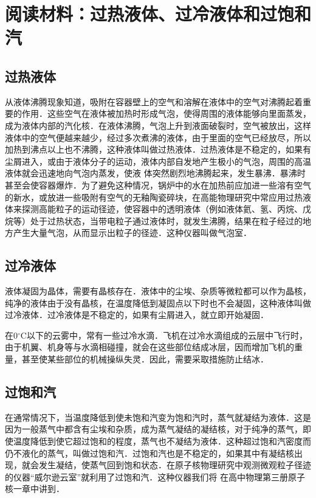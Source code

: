 \section*{阅读材料：过热液体、过冷液体和过饱和汽}
\subsection*{过热液体} 

从液体沸腾现象知道，吸附在容器壁上的空气和溶解在液体中的空气对沸腾起着重要的作用．这些空气在液体被加热时形成气泡，使得周围的液体能够向里面蒸发，成为液体内部的汽化核．在液体沸腾，气泡上升到液面破裂时，空气被放出，这样液体中的空气便越来越少，经过多次煮沸的液体，由于里面的空气已经放尽，所以加热到沸点以上也不沸腾，这种液体叫做过热液体．过热液体是不稳定的，如果有尘屑进入，或由于液体分子的运动，液体内部自发地产生极小的气泡，周围的高温液体就会迅速地向气泡内蒸发，使液
体突然剧烈地沸腾起来，发生暴沸．暴沸时甚至会使容器爆炸．为了避免这种情况，锅炉中的水在加热前应加进一些溶有空气的新水，或放进一些吸附有空气的无釉陶瓷碎块，在高能物理研究中常应用过热液体来探测高能粒子的运动径迹，使容器中的透明液体（例如液体氦、氢、丙烷、戊烷等）处于过热状态，当带电粒子通过液体时，就发生沸腾，结果在粒子经过的地方产生大量气泡，从而显示出粒子的径迹．这种仪器叫做气泡室．

\subsection*{过冷液体} 
液体凝固为晶体，需要有晶核存在．液体中的尘埃、杂质等微粒都可以作为晶核，纯净的液体由于没有晶核，在温度降低到凝固点以下时也不会凝固，这种液体叫做过冷液体．过冷液体是不稳定的，如果有尘屑进入，就立即开始凝固．

在0$^\circ$C以下的云雾中，常有一些过冷水滴．飞机在过冷水滴组成的云层中飞行时，由于机翼、机身等与水滴相碰撞，就会在这些部位结成冰层，因而增加飞机的重量，甚至使某些部位的机械操纵失灵．因此，需要采取措施防止结冰．

\subsection*{过饱和汽} 
在通常情况下，当温度降低到使未饱和汽变为饱和汽时，蒸气就凝结为液体．这是因为一般蒸气中都含有尘埃和杂质，成为蒸气凝结的凝结核，对于纯净的蒸气，即使温度降低到使它超过饱和的程度，蒸气也不凝结为液体．这种超过饱和汽密度而仍不液化的蒸气，叫做过饱和汽．过饱和汽也是不稳定的，如果其中有凝结核出现，就会发生凝结，使蒸气回到饱和状态．在原子核物理研究中观测微观粒子径迹的仪器“威尔逊云室”就利用了过饱和汽．这种仪器我们将
在高中物理第三册原子核一章中讲到．


